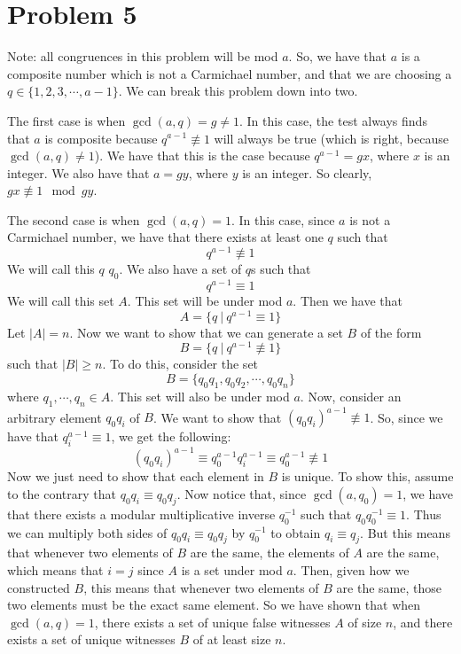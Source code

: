 \documentclass{article}
\begin{document}
\section*{Problem 5}
Note: all congruences in this problem will be mod $a$.
So, we have that $a$ is a composite number which is not a Carmichael number,
and that we are choosing a $q \in \{1,2,3,\cdots,a-1\}$.
We can break this problem down into two.

The first case is when $\gcd (a,q) = g \neq 1$. In this case, the test always
finds that $a$ is composite because $q^{a-1} \not\equiv 1$ will always be
true (which is right, because $\gcd(a,q) \neq 1$). We have that this is the
case because $q^{a-1} = gx$, where $x$ is an integer. We also have that
$a = gy$, where $y$ is an integer. So clearly, $gx \not\equiv 1 \mod gy$.

The second case is when $\gcd (a,q) = 1$. In this case, since $a$ is not
a Carmichael number, we have that there exists at least one $q$ such that
\[ q^{a-1} \not\equiv 1 \]
We will call this $q$ $q_0$. We also have a set of $q$s such that
\[ q^{a-1} \equiv 1 \]
We will call this set $A$. This set will be under mod $a$. Then we have that
\[ A = \{q \ | \  q^{a-1} \equiv 1 \} \]
Let $|A| = n$.
Now we want to show that we can generate a set $B$ of the form
\[ B = \{q \ | \ q^{a-1} \not\equiv 1 \} \]
such that $|B| \geq n$. To do this, consider the set
\[ B = \{ q_0q_1, q_0q_2, \cdots, q_0q_n \} \]
where $q_1, \cdots, q_n \in A$. This set will also be under mod $a$.
Now, consider an arbitrary element
$q_0q_i$ of $B$. We want to show that $(q_0q_i)^{a-1} \not\equiv 1$. So,
since we have that $q_i^{a-1} \equiv 1$, we get the following:
\[ (q_0q_i)^{a-1} \equiv q_0^{a-1}q_i^{a-1} \equiv q_0^{a-1} \not\equiv 1 \]
Now we just need to show that each element in $B$ is unique. To show this,
assume to the contrary that $q_0q_i \equiv q_0q_j$. Now notice that,
since $\gcd (a, q_0) = 1$, we have that there exists a modular multiplicative
inverse $q_0^{-1}$ such that $q_0q_0^{-1} \equiv 1$. Thus we can multiply
both sides of $q_0q_i \equiv q_0q_j$ by $q_0^{-1}$ to obtain
$q_i \equiv q_j$. But this means that whenever two elements of $B$ are the
same, the elements of $A$ are the same, which means that $i=j$ since $A$
is a set under mod $a$. Then, given
how we constructed $B$, this means that whenever two elements of $B$ are the
same, those two elements must be the exact same element. So we have shown
that when $\gcd (a,q) = 1$, there exists a set of unique false witnesses $A$ of
size $n$, and there exists a set of unique witnesses $B$ of at least size $n$.
\end{document}
